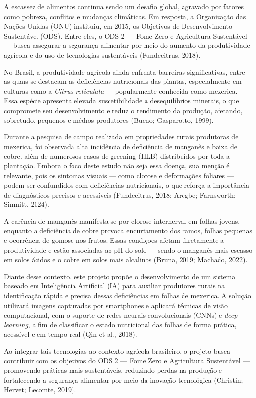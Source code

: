 A escassez de alimentos continua sendo um desafio global, agravado por fatores como pobreza, conflitos e mudanças climáticas. Em resposta, a Organização das Nações Unidas (ONU) instituiu, em 2015, os Objetivos de Desenvolvimento Sustentável (ODS). Entre eles, o ODS 2 — Fome Zero e Agricultura Sustentável — busca assegurar a segurança alimentar por meio do aumento da produtividade agrícola e do uso de tecnologias sustentáveis (Fundecitrus, 2018).

No Brasil, a produtividade agrícola ainda enfrenta barreiras significativas, entre as quais se destacam as deficiências nutricionais das plantas, especialmente em culturas como a \textit{Citrus reticulata} — popularmente conhecida como mexerica. Essa espécie apresenta elevada suscetibilidade a desequilíbrios minerais, o que compromete seu desenvolvimento e reduz o rendimento da produção, afetando, sobretudo, pequenos e médios produtores (Bueno; Gasparotto, 1999).

Durante a pesquisa de campo realizada em propriedades rurais produtoras de mexerica, foi observada alta incidência de deficiência de manganês e baixa de cobre, além de numerosos casos de greening (HLB) distribuídos por toda a plantação. Embora o foco deste estudo não seja essa doença, sua menção é relevante, pois os sintomas visuais — como clorose e deformações foliares — podem ser confundidos com deficiências nutricionais, o que reforça a importância de diagnósticos precisos e acessíveis (Fundecitrus, 2018; Aregbe; Farnsworth; Simnitt, 2024).

A carência de manganês manifesta-se por clorose internerval em folhas jovens, enquanto a deficiência de cobre provoca encurtamento dos ramos, folhas pequenas e ocorrência de gomose nos frutos. Essas condições afetam diretamente a produtividade e estão associadas ao pH do solo — sendo o manganês mais escasso em solos ácidos e o cobre em solos mais alcalinos (Bruna, 2019; Machado, 2022).

Diante desse contexto, este projeto propõe o desenvolvimento de um sistema baseado em Inteligência Artificial (IA) para auxiliar produtores rurais na identificação rápida e precisa dessas deficiências em folhas de mexerica. A solução utilizará imagens capturadas por smartphones e aplicará técnicas de visão computacional, com o suporte de redes neurais convolucionais (CNNs) e \textit{deep learning}, a fim de classificar o estado nutricional das folhas de forma prática, acessível e em tempo real (Qin et al., 2018).

Ao integrar tais tecnologias ao contexto agrícola brasileiro, o projeto busca contribuir com os objetivos do ODS 2 — Fome Zero e Agricultura Sustentável — promovendo práticas mais sustentáveis, reduzindo perdas na produção e fortalecendo a segurança alimentar por meio da inovação tecnológica (Christin; Hervet; Lecomte, 2019).